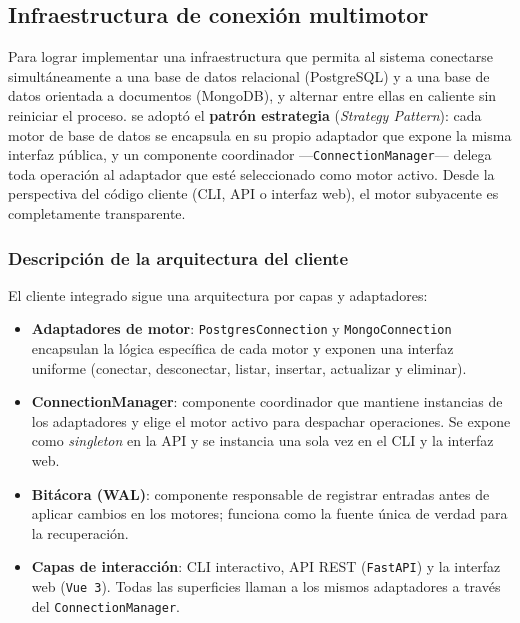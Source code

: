 \documentclass[12pt,letterpaper]{article}
\begin{document}
\subsection{Infraestructura de conexión multimotor}

Para lograr implementar una infraestructura que permita al sistema conectarse simultáneamente a una base de datos relacional (PostgreSQL) y a una base de datos orientada a documentos (MongoDB), y alternar entre ellas en caliente sin reiniciar el proceso. se adoptó el \textbf{patrón estrategia} (\textit{Strategy Pattern}): cada motor de
base de datos se encapsula en su propio adaptador que expone la misma interfaz pública,
y un componente coordinador ---\texttt{ConnectionManager}--- delega toda operación al adaptador
que esté seleccionado como motor activo. Desde la perspectiva del código cliente (CLI, API o
interfaz web), el motor subyacente es completamente transparente.

\subsubsection{Descripción de la arquitectura del cliente}

El cliente integrado sigue una arquitectura por capas y adaptadores:

\begin{itemize}
    \item \textbf{Adaptadores de motor}: \texttt{PostgresConnection} y \texttt{MongoConnection} encapsulan la lógica específica de cada motor y exponen una interfaz uniforme (conectar, desconectar, listar, insertar, actualizar y eliminar).

    \item \textbf{ConnectionManager}: componente coordinador que mantiene instancias de los adaptadores y elige el motor activo para despachar operaciones. Se expone como \textit{singleton} en la API y se instancia una sola vez en el CLI y la interfaz web.

    \item \textbf{Bitácora (WAL)}: componente responsable de registrar entradas antes de aplicar cambios en los motores; funciona como la fuente única de verdad para la recuperación.

    \item \textbf{Capas de interacción}: CLI interactivo, API REST (\texttt{FastAPI}) y la interfaz web (\texttt{Vue 3}). Todas las superficies llaman a los mismos adaptadores a través del \texttt{ConnectionManager}.
\end{itemize}
\end{document}
